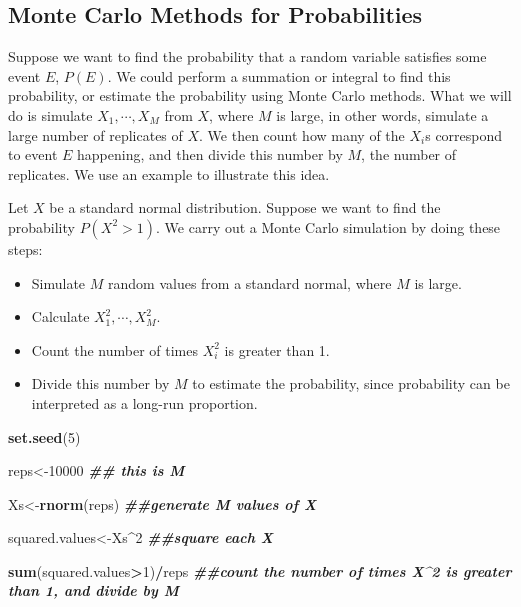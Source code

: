 \documentclass[
]{book}
\newenvironment{Shaded}{\begin{snugshade}}{\end{snugshade}}
\newcommand{\DecValTok}[1]{\textcolor[rgb]{0.00,0.00,0.81}{#1}}
\newcommand{\DocumentationTok}[1]{\textcolor[rgb]{0.56,0.35,0.01}{\textbf{\textit{#1}}}}
\newcommand{\FunctionTok}[1]{\textcolor[rgb]{0.13,0.29,0.53}{\textbf{#1}}}
\newcommand{\NormalTok}[1]{#1}
\newcommand{\OtherTok}[1]{\textcolor[rgb]{0.56,0.35,0.01}{#1}}
\newcommand{\SpecialCharTok}[1]{\textcolor[rgb]{0.81,0.36,0.00}{\textbf{#1}}}
\providecommand{\tightlist}{%
  \setlength{\itemsep}{0pt}\setlength{\parskip}{0pt}}
\begin{document}
\subsection{Monte Carlo Methods for Probabilities}\label{monte-carlo-methods-for-probabilities}

Suppose we want to find the probability that a random variable satisfies some event \(E\), \(P(E)\). We could perform a summation or integral to find this probability, or estimate the probability using Monte Carlo methods. What we will do is simulate \(X_1, \cdots, X_M\) from \(X\), where \(M\) is large, in other words, simulate a large number of replicates of \(X\). We then count how many of the \(X_i\)s correspond to event \(E\) happening, and then divide this number by \(M\), the number of replicates. We use an example to illustrate this idea.

Let \(X\) be a standard normal distribution. Suppose we want to find the probability \(P(X^2 > 1)\). We carry out a Monte Carlo simulation by doing these steps:

\begin{itemize}
\tightlist
\item
  Simulate \(M\) random values from a standard normal, where \(M\) is large.
\item
  Calculate \(X_1^2, \cdots, X_M^2\).
\item
  Count the number of times \(X_i^2\) is greater than 1.
\item
  Divide this number by \(M\) to estimate the probability, since probability can be interpreted as a long-run proportion.
\end{itemize}

\begin{Shaded}
\begin{Highlighting}[]
\FunctionTok{set.seed}\NormalTok{(}\DecValTok{5}\NormalTok{)}

\NormalTok{reps}\OtherTok{\textless{}{-}}\DecValTok{10000} \DocumentationTok{\#\# this is M}

\NormalTok{Xs}\OtherTok{\textless{}{-}}\FunctionTok{rnorm}\NormalTok{(reps) }\DocumentationTok{\#\#generate M values of X}

\NormalTok{squared.values}\OtherTok{\textless{}{-}}\NormalTok{Xs}\SpecialCharTok{\^{}}\DecValTok{2} \DocumentationTok{\#\#square each X}

\FunctionTok{sum}\NormalTok{(squared.values}\SpecialCharTok{\textgreater{}}\DecValTok{1}\NormalTok{)}\SpecialCharTok{/}\NormalTok{reps }\DocumentationTok{\#\#count the number of times X\^{}2 is greater than 1, and divide by M}
\end{Highlighting}
\end{Shaded}
\end{document}
